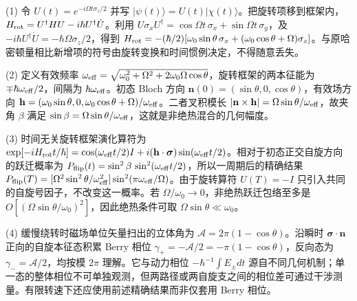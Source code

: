 (1) 令 \(U(t)=e^{-i\Omega t\sigma_z/2}\) 并写 \(|\psi(t)\rangle=U(t)|\chi(t)\rangle\)。把旋转项移到框架内，\(H_{\rm rot}=U^\dagger HU-i\hbar U^\dagger\dot U\)。利用 \(U\sigma_xU^\dagger=\cos\Omega t\,\sigma_x+\sin\Omega t\,\sigma_y\)，及 \(-i\hbar U^\dagger\dot U=-\hbar\Omega\sigma_z/2\)，得到 \(H_{\rm rot}=-(\hbar/2)[\omega_0\sin\theta\,\sigma_x+(\omega_0\cos\theta+\Omega)\sigma_z]\)。与原哈密顿量相比新增项的符号由旋转变换和时间惯例决定，不得随意丢失。

(2) 定义有效频率 \(\omega_{\rm eff}=\sqrt{\omega_0^2+\Omega^2+2\omega_0\Omega\cos\theta}\)，旋转框架的两本征能为 \(\mp\hbar\omega_{\rm eff}/2\)，间隔为 \(\hbar\omega_{\rm eff}\)。初态 Bloch 方向 \(\mathbf n(0)=(\sin\theta,0,\cos\theta)\)，有效场方向 \(\mathbf h=(\omega_0\sin\theta,0,\omega_0\cos\theta+\Omega)/\omega_{\rm eff}\)。二者叉积模长 \(|\mathbf n\times\mathbf h|=\Omega\sin\theta/\omega_{\rm eff}\)，故夹角 \(\beta\) 满足 \(\sin\beta=\Omega\sin\theta/\omega_{\rm eff}\)，这就是非绝热混合的几何幅度。

(3) 时间无关旋转框架演化算符为 \(\exp[-iH_{\rm rot}t/\hbar]=\cos(\omega_{\rm eff}t/2)I+i(\mathbf h\cdot\boldsymbol\sigma)\sin(\omega_{\rm eff}t/2)\)。相对于初态正交自旋方向的跃迁概率为 \(P_{\rm flip}(t)=\sin^2\beta\,\sin^2(\omega_{\rm eff}t/2)\)，所以一周期后的精确结果 \(P_{\rm flip}(T)=[\Omega^2\sin^2\theta/\omega_{\rm eff}^2]\sin^2(\pi\omega_{\rm eff}/\Omega)\)。由于旋转算符 \(U(T)=-I\) 只引入共同的自旋号因子，不改变这一概率。若 \(\Omega/\omega_0\to0\)，非绝热跃迁包络至多是 \(O[(\Omega\sin\theta/\omega_0)^2]\)，因此绝热条件可取 \(\Omega\sin\theta\ll\omega_0\)。

(4) 缓慢绕转时磁场单位矢量扫出的立体角为 \(\mathcal A=2\pi(1-\cos\theta)\)。沿瞬时 \(\boldsymbol\sigma\cdot\mathbf n\) 正向的自旋本征态积累 Berry 相位 \(\gamma_+=-\mathcal A/2=-\pi(1-\cos\theta)\)，反向态为 \(\gamma_-=\mathcal A/2\)，均按模 \(2\pi\) 理解。它与动力相位 \(-\hbar^{-1}\int E_\pm dt\) 源自不同几何机制；单一态的整体相位不可单独观测，但两路径或两自旋支之间的相位差可通过干涉测量。有限转速下还应使用前述精确结果而非仅套用 Berry 相位。
